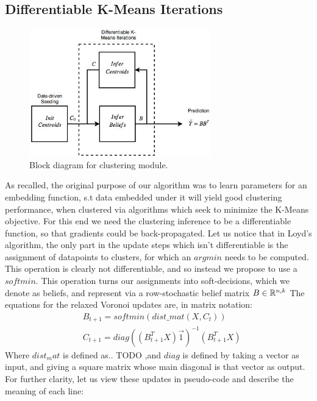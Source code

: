\subsection{Differentiable K-Means Iterations}
\begin{figure}[h!]
\centering
\includegraphics[width=0.7\textwidth]{imgs/dkmpp.jpg}
\caption{\label{fig:frog}Block diagram for clustering module.}
\end{figure}
As recalled, the original purpose of our algorithm was to learn parameters for an embedding function, s.t data embedded under it will yield good clustering performance, when clustered via algorithms which seek to minimize the K-Means objective. For this end we need the clustering inference to be a differentiable function, so that gradients could be back-propagated.
Let us notice that in Loyd's algorithm, the only part in the update steps which isn't differentiable is the assignment of datapoints to clusters, for which an $argmin$ needs to be computed. This operation is clearly not differentiable, and so instead we propose to use a $softmin$. This operation turns our assignments into soft-decisions, which we denote as beliefs, and represent via a row-stochastic belief matrix $B\in \mathbb{R}^{n,k}$
The equations for the relaxed Voronoi updates are, in matrix notation: 
\begin{equation*} 
\begin{aligned}
& B_{t+1} = softmin(dist\_mat(X,C_{t})) \\
& C_{t+1} = diag((B_{t+1}^T X)\vec{1} )^{-1}(B_{t+1}^T X)
\end{aligned}
\end{equation*}
Where $dist_mat$ is defined as.. TODO 
,and $diag$ is defined by taking a vector as input, and giving a square matrix whose main diagonal is that vector as output.
For further clarity, let us view these updates in pseudo-code and describe the meaning of each line:




